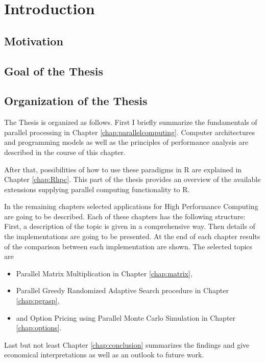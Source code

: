\chapter{Introduction}
\section{Motivation}
\section{Goal of the Thesis}
\section{Organization of the Thesis}

The Thesis is organized as follows. First I briefly summarize the
fundamentals of parallel processing in Chapter
\ref{chap:parallelcomputing}. Computer architectures and programming
models as well as the principles of performance analysis are described
in the course of this chapter.

After that, possibilities of how to
use these paradigms in R are explained in Chapter
\ref{chap:Rhpc}. This part of the thesis provides an overview of the
available extensions supplying parallel computing functionality to R.

In the remaining chapters selected applications for High Performance
Computing are going to be
described. Each of these chapters has the following structure: First,
a description of the topic is given in a comprehensive way. Then
details of the implementations are going to be presented. At the end of
each chapter results of the comparison between each implementation are
shown.
The selected topics are
\begin{itemize}
\item Parallel Matrix Multiplication in Chapter \ref{chap:matrix},
\item Parallel Greedy Randomized Adaptive Search procedure in Chapter
  \ref{chap:pgrasp},
\item and Option Pricing using Parallel Monte Carlo Simulation in Chapter
  \ref{chap:options}.
\end{itemize}
Last but not least Chapter \ref{chap:conclusion} summarizes
the findings and give economical interpretations as well as an outlook
to future work.
